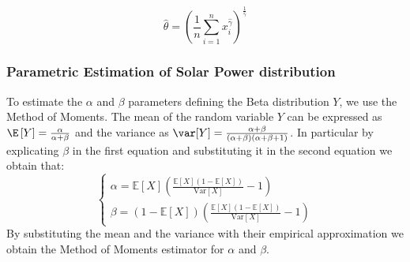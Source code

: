{\begin{equation}
\hat{\theta} = \left( \frac{1}{n} \sum_{i=1}^{n} x_i^{\hat{\gamma}} \right)^{\frac{1}{\hat{\gamma}}}
\end{equation}




\subsubsection{Parametric Estimation of Solar Power distribution}
\label{subsection: beta estim}

To estimate the \(\alpha\) and \(\beta\) parameters defining the Beta distribution \(Y\), we use the Method of Moments.
The mean of the random variable \(Y\) can be expressed as \(\E\left[ Y\right] = \frac{\alpha}{\alpha + \beta} \) and the variance as \(\var [Y]= \frac{\alpha + \beta}{(\alpha + \beta)(\alpha + \beta + 1)}\). In particular by explicating \(\beta\) in the first equation and substituting it in the second equation we obtain that:
\begin{equation}
\begin{cases}
\alpha = \mathbb{E}[X] \left( \frac{\mathbb{E}[X](1 - \mathbb{E}[X])}{\mathrm{Var}[X]} - 1 \right) \\
\beta = (1 - \mathbb{E}[X]) \left( \frac{\mathbb{E}[X](1 - \mathbb{E}[X])}{\mathrm{Var}[X]} - 1 \right)
\end{cases}
\end{equation}
By substituting the mean and the variance with their empirical approximation we obtain the Method of Moments estimator for \(\alpha\) and \(\beta\).


}
